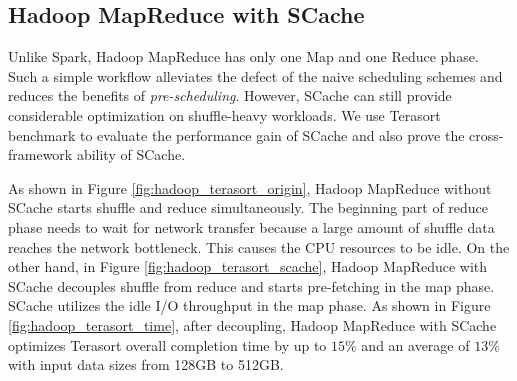 {\color{black}
\subsection{Hadoop MapReduce with SCache}

{\color{blue}
Unlike Spark, Hadoop MapReduce has only one Map and one Reduce phase.
Such a simple workflow alleviates the defect of the naive scheduling schemes and reduces the benefits of \textit{pre-scheduling}.
However, SCache can still provide considerable optimization on shuffle-heavy workloads.
We use Terasort benchmark to evaluate the performance gain of SCache and also prove the cross-framework ability of SCache.
}

As shown in Figure \ref{fig:hadoop_terasort_origin}, Hadoop MapReduce without SCache starts shuffle and reduce simultaneously.
The beginning part of reduce phase needs to wait for network transfer because a large amount of shuffle data reaches the network bottleneck.
This causes the CPU resources to be idle. 
On the other hand, in Figure \ref{fig:hadoop_terasort_scache}, Hadoop MapReduce with SCache decouples shuffle from reduce and starts pre-fetching in the map phase.
SCache utilizes the idle I/O throughput in the map phase.
As shown in Figure \ref{fig:hadoop_terasort_time}, after decoupling, Hadoop MapReduce with SCache optimizes Terasort overall completion time by up to $15\%$ and an average of $13\%$ with input data sizes from 128GB to 512GB.
}

